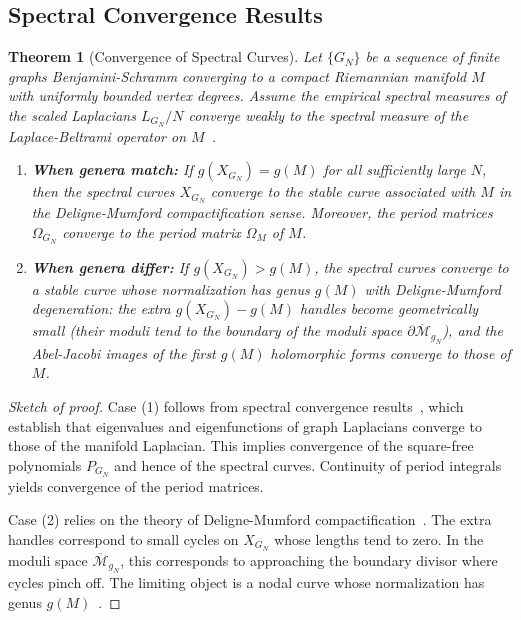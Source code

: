 \documentclass[12pt]{article}
\newtheorem{theorem}{Theorem}[section]
\theoremstyle{definition}
\begin{document}
\subsection{Spectral Convergence Results}
\begin{theorem}[Convergence of Spectral Curves]\label{thm:convergence}
Let $\{G_N\}$ be a sequence of finite graphs Benjamini-Schramm converging to a compact Riemannian manifold $M$ with uniformly bounded vertex degrees. Assume the empirical spectral measures of the scaled Laplacians $L_{G_N} / N$ converge weakly to the spectral measure of the Laplace-Beltrami operator on $M$~\cite{Belkin2006, Trillos2018}.

\begin{enumerate}
\item \textbf{When genera match:} If $g(X_{G_N}) = g(M)$ for all sufficiently large $N$, then the spectral curves $X_{G_N}$ converge to the stable curve associated with $M$ in the Deligne-Mumford compactification sense. Moreover, the period matrices $\Omega_{G_N}$ converge to the period matrix $\Omega_M$ of $M$.

\item \textbf{When genera differ:} If $g(X_{G_N}) > g(M)$, the spectral curves converge to a stable curve whose normalization has genus $g(M)$ with Deligne-Mumford degeneration: the extra $g(X_{G_N}) - g(M)$ handles become geometrically small (their moduli tend to the boundary of the moduli space $\partial\overline{\mathcal{M}}_{g_N}$), and the Abel-Jacobi images of the first $g(M)$ holomorphic forms converge to those of $M$.
\end{enumerate}
\end{theorem}

\begin{proof}[Sketch of proof]
Case (1) follows from spectral convergence results~\cite{Belkin2006, Trillos2018}, which establish that eigenvalues and eigenfunctions of graph Laplacians converge to those of the manifold Laplacian. This implies convergence of the square-free polynomials $P_{G_N}$ and hence of the spectral curves. Continuity of period integrals yields convergence of the period matrices.

Case (2) relies on the theory of Deligne-Mumford compactification~\cite{Deligne1969}. The extra handles correspond to small cycles on $X_{G_N}$ whose lengths tend to zero. In the moduli space $\overline{\mathcal{M}}_{g_N}$, this corresponds to approaching the boundary divisor where cycles pinch off. The limiting object is a nodal curve whose normalization has genus $g(M)$~\cite{Hubbard1986}.
\end{proof}
\end{document}
